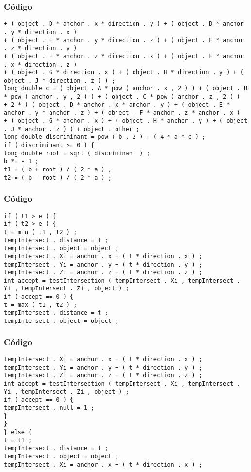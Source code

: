 \documentclass{beamer}
\begin{document}
\begin{frame}[fragile]
\frametitle{C\'odigo}
\begin{verbatim}
+ ( object . D * anchor . x * direction . y ) + ( object . D * anchor . y * direction . x ) 
+ ( object . E * anchor . y * direction . z ) + ( object . E * anchor . z * direction . y ) 
+ ( object . F * anchor . z * direction . x ) + ( object . F * anchor . x * direction . z ) 
+ ( object . G * direction . x ) + ( object . H * direction . y ) + ( object . J * direction . z ) ) ; 
long double c = ( object . A * pow ( anchor . x , 2 ) ) + ( object . B * pow ( anchor . y , 2 ) ) + ( object . C * pow ( anchor . z , 2 ) ) 
+ 2 * ( ( object . D * anchor . x * anchor . y ) + ( object . E * anchor . y * anchor . z ) + ( object . F * anchor . z * anchor . x ) 
+ ( object . G * anchor . x ) + ( object . H * anchor . y ) + ( object . J * anchor . z ) ) + object . other ; 
long double discriminant = pow ( b , 2 ) - ( 4 * a * c ) ; 
if ( discriminant >= 0 ) { 
long double root = sqrt ( discriminant ) ; 
b *= - 1 ; 
t1 = ( b + root ) / ( 2 * a ) ; 
t2 = ( b - root ) / ( 2 * a ) ; 
\end{verbatim}
\end{frame}
\begin{frame}[fragile]
\frametitle{C\'odigo}
\begin{verbatim}
if ( t1 > e ) { 
if ( t2 > e ) { 
t = min ( t1 , t2 ) ; 
tempIntersect . distance = t ; 
tempIntersect . object = object ; 
tempIntersect . Xi = anchor . x + ( t * direction . x ) ; 
tempIntersect . Yi = anchor . y + ( t * direction . y ) ; 
tempIntersect . Zi = anchor . z + ( t * direction . z ) ; 
int accept = testIntersection ( tempIntersect . Xi , tempIntersect . Yi , tempIntersect . Zi , object ) ; 
if ( accept == 0 ) { 
t = max ( t1 , t2 ) ; 
tempIntersect . distance = t ; 
tempIntersect . object = object ; 
\end{verbatim}
\end{frame}
\begin{frame}[fragile]
\frametitle{C\'odigo}
\begin{verbatim}
tempIntersect . Xi = anchor . x + ( t * direction . x ) ; 
tempIntersect . Yi = anchor . y + ( t * direction . y ) ; 
tempIntersect . Zi = anchor . z + ( t * direction . z ) ; 
int accept = testIntersection ( tempIntersect . Xi , tempIntersect . Yi , tempIntersect . Zi , object ) ; 
if ( accept == 0 ) { 
tempIntersect . null = 1 ; 
} 
} 
} else { 
t = t1 ; 
tempIntersect . distance = t ; 
tempIntersect . object = object ; 
tempIntersect . Xi = anchor . x + ( t * direction . x ) ; 
\end{verbatim}
\end{frame}
\end{document}
